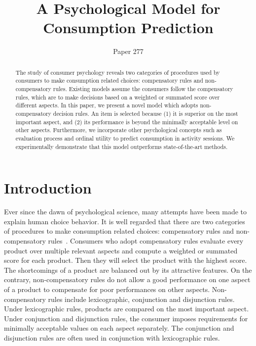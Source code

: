 \documentclass[sigconf]{acmart}
\begin{document}
\title{A Psychological Model for Consumption Prediction}


\author{Paper 277}


\begin{abstract}
The study of consumer psychology reveals two categories of procedures used by consumers to make consumption related choices: compensatory rules and non-compensatory rules. Existing models assume the consumers follow the compensatory rules, which are to make decisions based on a weighted or summated score over different aspects. In this paper, we present a novel model which adopts non-compensatory decision rules. An item is selected because  (1) it is superior on the most important aspect, and (2) its performance is beyond the minimally acceptable level on other aspects. Furthermore, we incorporate other psychological concepts such as evaluation process and ordinal utility to predict consumption in activity sessions. We experimentally demonstrate that this model outperforms state-of-the-art methods.
\end{abstract}




\maketitle
\section{Introduction}\label{sec:introduction}


Ever since the dawn of psychological science, many attempts have been made to explain human choice behavior. It is well regarded that there are two categories of procedures to make consumption related choices: compensatory rules and non-compensatory rules~\cite{Engel1986Consumer}. Consumers who adopt compensatory rules evaluate every product over multiple relevant aspects and compute a weighted or summated score for each product. Then they will select the product with the highest score. The shortcomings of a product are balanced out by its attractive features. On the contrary, non-compensatory rules do not allow a good performance on one aspect of a product to compensate for poor performances on other aspects. Non-compensatory rules include lexicographic, conjunction and disjunction rules. Under lexicographic rules, products are compared on the most important aspect. Under conjunction and disjunction rules, the consumer imposes requirements for minimally acceptable values on each aspect separately. The conjunction and disjunction rules are often used in conjunction with lexicographic rules.
\end{document}
